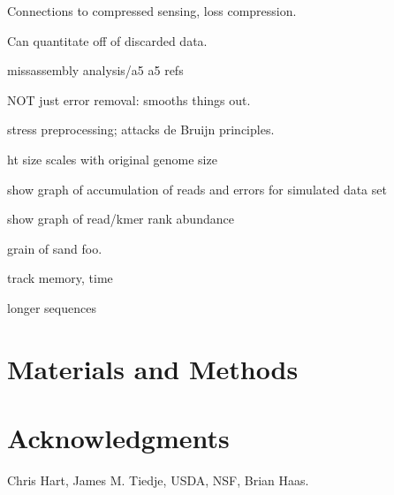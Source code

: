 \documentclass[10pt,draft]{article}
\begin{document}
Connections to compressed sensing, loss compression.

Can quantitate off of discarded data.





missassembly analysis/a5
a5 refs

NOT just error removal: smooths things out.

stress preprocessing; attacks de Bruijn principles.

ht size scales with original genome size

show graph of accumulation of reads and errors for simulated data set

show graph of read/kmer rank abundance

grain of sand foo.


track memory, time

longer sequences

\section*{Materials and Methods}

\section*{Acknowledgments}

Chris Hart, James M. Tiedje, USDA, NSF, Brian Haas.


\end{document}
